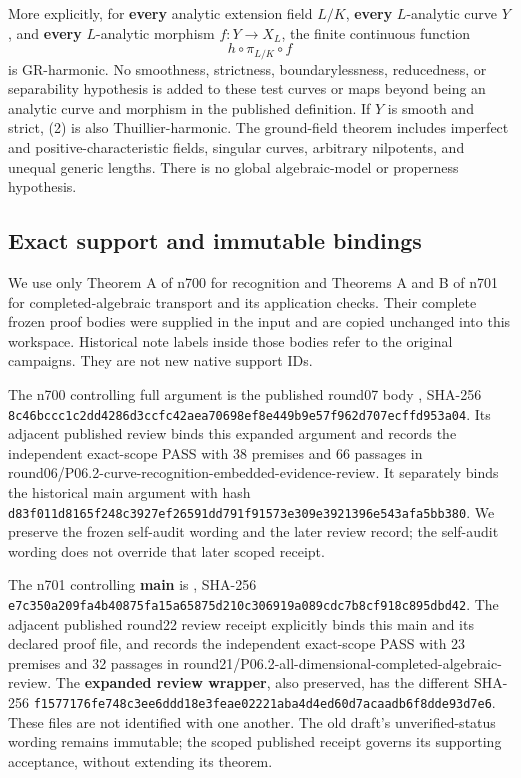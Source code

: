 \documentclass[
  11pt,
]{article}
\begin{document}
More explicitly, for \textbf{every} analytic extension field \(L/K\),
\textbf{every} \(L\)-analytic curve \(Y\), and \textbf{every}
\(L\)-analytic morphism \(f:Y\to X_L\), the finite continuous function
\[
                         h\circ\pi_{L/K}\circ f           \tag{2}
\] is GR-harmonic. No smoothness, strictness, boundarylessness,
reducedness, or separability hypothesis is added to these test curves or
maps beyond being an analytic curve and morphism in the published
definition. If \(Y\) is smooth and strict, (2) is also
Thuillier-harmonic. The ground-field theorem includes imperfect and
positive-characteristic fields, singular curves, arbitrary nilpotents,
and unequal generic lengths. There is no global algebraic-model or
properness hypothesis.

\subsection{Exact support and immutable
bindings}\label{exact-support-and-immutable-bindings}

We use only Theorem A of n700 for recognition and Theorems A and B of
n701 for completed-algebraic transport and its application checks. Their
complete frozen proof bodies were supplied in the input and are copied
unchanged into this workspace. Historical note labels inside those
bodies refer to the original campaigns. They are not new native support
IDs.

The n700 controlling full argument is the published round07 body
,
SHA-256
\nolinkurl{8c46bccc1c2dd4286d3ccfc42aea70698ef8e449b9e57f962d707ecffd953a04}.
Its adjacent published review binds this expanded argument and records
the independent exact-scope PASS with 38 premises and 66 passages in
round06/P06.2-curve-recognition-embedded-evidence-review. It separately
binds the historical main argument with hash
\nolinkurl{d83f011d8165f248c3927ef26591dd791f91573e309e3921396e543afa5bb380}.
We preserve the frozen self-audit wording and the later review record;
the self-audit wording does not override that later scoped receipt.

The n701 controlling \textbf{main} is
,
SHA-256
\nolinkurl{e7c350a209fa4b40875fa15a65875d210c306919a089cdc7b8cf918c895dbd42}.
The adjacent published round22 review receipt explicitly binds this main
and its declared proof file, and records the independent exact-scope
PASS with 23 premises and 32 passages in
round21/P06.2-all-dimensional-completed-algebraic-review. The
\textbf{expanded review wrapper}, also preserved, has the different
SHA-256
\nolinkurl{f1577176fe748c3ee6ddd18e3feae02221aba4d4ed60d7acaadb6f8dde93d7e6}.
These files are not identified with one another. The old draft's
unverified-status wording remains immutable; the scoped published
receipt governs its supporting acceptance, without extending its
theorem.
\end{document}
